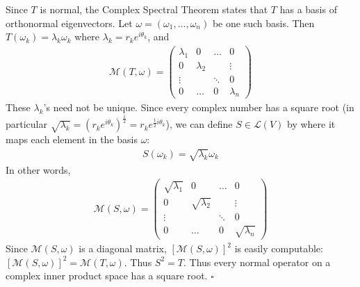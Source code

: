 \documentclass[12pt]{article}
\begin{document}
\noindent Since $T$ is normal, the Complex Spectral Theorem states that $T$ has a basis of orthonormal eigenvectors.  Let $\omega = (\omega_1, \dots, \omega_n)$ be one such basis.  Then $T(\omega_k) = \lambda_k\omega_k$ where $\lambda_k = r_ke^{i\theta_k}$, and
\begin{align*}
		\mathcal{M}(T, \omega) = \left(\begin{array}{cccc}
				\lambda_1 & 0 & \dots & 0 \\
				0 & \lambda_2 & & \vdots \\
				\vdots & & \ddots & 0 \\
				0 & \dots & 0 & \lambda_n
		\end{array}\right)
\end{align*}
These $\lambda_k$'s need not be unique.  Since every complex number has a square root (in particular $\sqrt{\lambda_k} = (r_ke^{i\theta_k})^{\frac{1}{2}} = r_ke^{\frac{1}{2}i\theta_k}$), we can define $S \in \mathcal{L}(V)$ by where it maps each element in the basis $\omega$:
\begin{align*}
		S(\omega_k) = \sqrt{\lambda_k}\omega_k
\end{align*}
In other words,
\begin{align*}
		\mathcal{M}(S, \omega) = \left(\begin{array}{cccc}
				\sqrt{\lambda_1} & 0 & \dots & 0 \\
				0 & \sqrt{\lambda_2} & & \vdots \\
				\vdots & & \ddots & 0 \\
				0 & \dots & 0 & \sqrt{\lambda_n}
		\end{array}\right)
\end{align*}
Since $\mathcal{M}(S, \omega)$ is a diagonal matrix, $[\mathcal{M}(S, \omega)]^2$ is easily computable: $[\mathcal{M}(S, \omega)]^2 = \mathcal{M}(T, \omega)$.  Thus $S^2 = T$.  Thus every normal operator on a complex inner product space has a square root. \hfill $\square$
\end{document}
